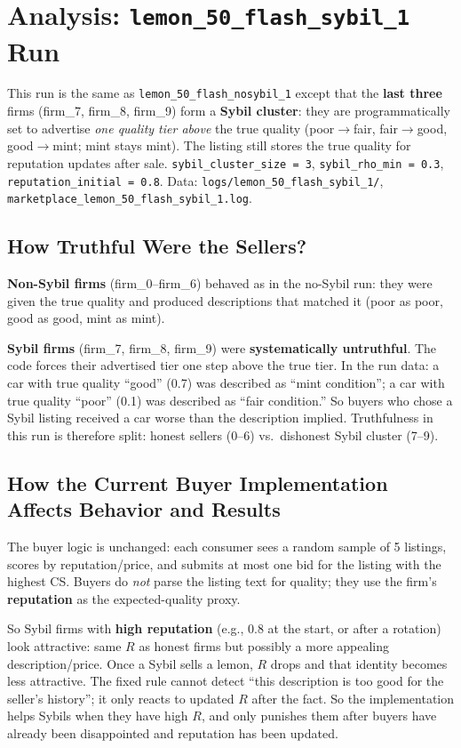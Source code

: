 \documentclass{article}
\begin{document}
\section{Analysis: \texttt{lemon\_50\_flash\_sybil\_1} Run}

This run is the same as \texttt{lemon\_50\_flash\_nosybil\_1} except that the \textbf{last three} firms (firm\_7, firm\_8, firm\_9) form a \textbf{Sybil cluster}: they are programmatically set to advertise \emph{one quality tier above} the true quality (poor\(\to\)fair, fair\(\to\)good, good\(\to\)mint; mint stays mint). The listing still stores the true quality for reputation updates after sale. \texttt{sybil\_cluster\_size = 3}, \texttt{sybil\_rho\_min = 0.3}, \texttt{reputation\_initial = 0.8}. Data: \texttt{logs/lemon\_50\_flash\_sybil\_1/}, \texttt{marketplace\_lemon\_50\_flash\_sybil\_1.log}.

\subsection{How Truthful Were the Sellers?}

\textbf{Non-Sybil firms} (firm\_0--firm\_6) behaved as in the no-Sybil run: they were given the true quality and produced descriptions that matched it (poor as poor, good as good, mint as mint).

\textbf{Sybil firms} (firm\_7, firm\_8, firm\_9) were \textbf{systematically untruthful}. The code forces their advertised tier one step above the true tier. In the run data: a car with true quality ``good'' (0.7) was described as ``mint condition''; a car with true quality ``poor'' (0.1) was described as ``fair condition.'' So buyers who chose a Sybil listing received a car worse than the description implied. Truthfulness in this run is therefore split: honest sellers (0--6) vs.\ dishonest Sybil cluster (7--9).

\subsection{How the Current Buyer Implementation Affects Behavior and Results}

The buyer logic is unchanged: each consumer sees a random sample of 5 listings, scores by reputation/price, and submits at most one bid for the listing with the highest CS. Buyers do \emph{not} parse the listing text for quality; they use the firm’s \textbf{reputation} as the expected-quality proxy.

So Sybil firms with \textbf{high reputation} (e.g., 0.8 at the start, or after a rotation) look attractive: same \(R\) as honest firms but possibly a more appealing description/price. Once a Sybil sells a lemon, \(R\) drops and that identity becomes less attractive. The fixed rule cannot detect ``this description is too good for the seller’s history''; it only reacts to updated \(R\) after the fact. So the implementation helps Sybils when they have high \(R\), and only punishes them after buyers have already been disappointed and reputation has been updated.
\end{document}
